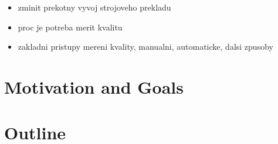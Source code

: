 \begin{itemize}
  \item zminit prekotny vyvoj strojoveho prekladu
  \item proc je potreba merit kvalitu
  \item zakladni pristupy mereni kvality, manualni, automaticke, dalsi zpusoby 
\end{itemize}




\begin{comment}
Machine Translation quality can be measured in two different ways: using human
evaluation or automatic metrics.  Altough human evaluation is considered more
accurate than automatic evaluation, it suffers some disadvantages.  It is slow
and expensive and therefore cannot be used in tuning parameters of statistical
models.

The aim of this thesis is to develop a new semi-automatic evaluation measure,
which would have advantages of both human evaluation and automatic evaluation.
The idea is to evaluate small sentence segments by human and create a database
of such annotation which could be used later to automatically evaluate new
unseen sentences.  This new measure should evaluate MT outputs more similarly
to how human do and still be cheap and fast after the initial database of
annotations is created once. It could be therefore used in tuning parameters of
MT systems.

The important part of the thesis is to design and develop a new annotation
environment which will be used to collect the annotations. This will be then used
to annotate wmt14 test data. The new measure will be analysed and compared to
current manual and automatic evaluation measures. 
\end{comment}

\section{Motivation and Goals}

\section{Outline}





